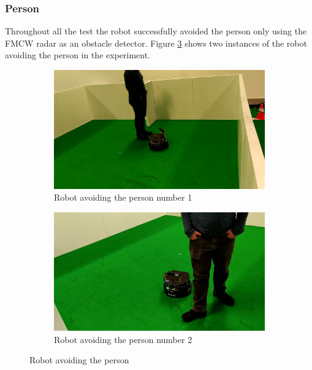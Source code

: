 \subsubsection{Person}
Throughout all the test the robot successfully avoided the person  only using the \ac{FMCW} \ac{radar} as an obstacle detector. Figure \ref{fig:exp3person} shows two instances of the robot avoiding the person in the experiment.
\begin{figure}[ht!]
  \centering
  \begin{subfigure}[b]{0.49\linewidth}
    \includegraphics[width=\linewidth]{imgs/chapter5/exp3person1.png}
     \caption{Robot avoiding the person number 1}
     \label{fig::exp3person1}
  \end{subfigure}
  \begin{subfigure}[b]{0.49\linewidth}
    \includegraphics[width=\linewidth]{imgs/chapter5/exp3person2.png}
    \caption{Robot avoiding the person  number 2}
    \label{fig::exp3person2}
  \end{subfigure}
  \caption{Robot avoiding the person }
  \label{fig:exp3person}
\end{figure}

